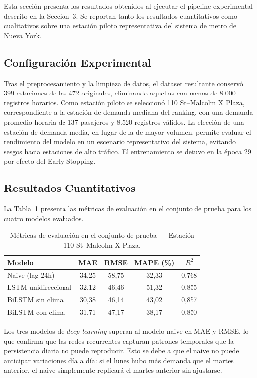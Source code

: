 \documentclass[preprint,12pt]{elsarticle}
\begin{document}
Esta sección presenta los resultados obtenidos al ejecutar el pipeline experimental descrito en la Sección~3. Se reportan tanto los resultados cuantitativos como cualitativos sobre una estación piloto representativa del sistema de metro de Nueva York.

\subsection{Configuración Experimental}

Tras el preprocesamiento y la limpieza de datos, el dataset resultante conservó 399 estaciones de las 472 originales, eliminando aquellas con menos de 8.000 registros horarios. Como estación piloto se seleccionó 110 St--Malcolm X Plaza, correspondiente a la estación de demanda mediana del ranking, con una demanda promedio horaria de 137 pasajeros y 8.520 registros válidos. La elección de una estación de demanda media, en lugar de la de mayor volumen, permite evaluar el rendimiento del modelo en un escenario representativo del sistema, evitando sesgos hacia estaciones de alto tráfico. El entrenamiento se detuvo en la época 29 por efecto del Early Stopping.

\subsection{Resultados Cuantitativos}

La Tabla~\ref{tab:resultados} presenta las métricas de evaluación en el conjunto de prueba para los cuatro modelos evaluados.

\begin{table}[htbp]
\centering
\caption{Métricas de evaluación en el conjunto de prueba — Estación 110 St--Malcolm X Plaza.}
\label{tab:resultados}
\small
\begin{tabular}{lcccc}
\toprule
\textbf{Modelo} & \textbf{MAE} & \textbf{RMSE} & \textbf{MAPE (\%)} & \textbf{$R^2$} \\
\midrule
Naive (lag 24h)       & 34,25 & 58,75 & 32,33 & 0,768 \\
LSTM unidireccional   & 32,12 & 46,46 & 51,32 & 0,855 \\
BiLSTM sin clima      & 30,38 & 46,14 & 43,02 & 0,857 \\
BiLSTM con clima      & 31,71 & 47,17 & 38,17 & 0,850 \\
\bottomrule
\end{tabular}
\end{table}

Los tres modelos de \textit{deep learning} superan al modelo naive en MAE y RMSE, lo que confirma que las redes recurrentes capturan patrones temporales que la persistencia diaria no puede reproducir. Esto se debe a que el naive no puede anticipar variaciones día a día: si el lunes hubo más demanda que el martes anterior, el naive simplemente replicará el martes anterior sin ajustarse.
\end{document}
